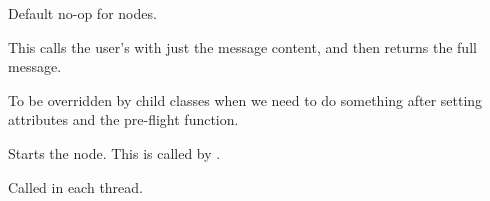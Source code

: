 \documentclass[letterpaper,10pt,english]{sphinxmanual}
\begin{document}
\begin{fulllineitems}

\begin{fulllineitems}
\label{\detokenize{api:nanostream.node.NanoNode.process_item}}
Default no-op for nodes.

\end{fulllineitems}


\begin{fulllineitems}
\label{\detokenize{api:nanostream.node.NanoNode.processor}}
This calls the user’s  with just the message content,
and then returns the full message.

\end{fulllineitems}


\begin{fulllineitems}
\label{\detokenize{api:nanostream.node.NanoNode.setup}}
To be overridden by child classes when we need to do something
after setting attributes and the pre-flight function.

\end{fulllineitems}


\begin{fulllineitems}
\label{\detokenize{api:nanostream.node.NanoNode.start}}
Starts the node. This is called by .

\end{fulllineitems}


\begin{fulllineitems}
\label{\detokenize{api:nanostream.node.NanoNode.stream}}
Called in each  thread.

\end{fulllineitems}


\end{fulllineitems}
\end{document}
